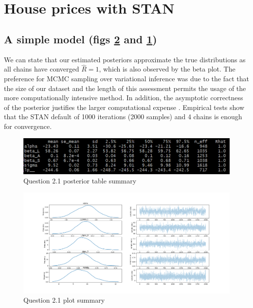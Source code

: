 \documentclass[11pt,a4paper,titlepage]{article}
\begin{document}
\section{House prices with STAN}
  \subsection{A simple model (figs \ref{fig:2.1} and \ref{tab:2.1})}
  We can state that our estimated posteriors approximate the true distributions as all chains have converged \(\hat{R} = 1\), which is also observed by the beta plot. The preference for MCMC sampling over variational inference was due to the fact that the size of our dataset and the length of this assessment permits the usage of the more computationally intensive method. In addition, the asymptotic correctness of the posterior justifies the larger computational expense \parencite{BleiVI}. Empirical tests show that the STAN default of 1000 iterations (2000 samples) and 4 chains is enough for convergence.

  \begin{figure}[htb]
    \centering
      \includegraphics[width=\textwidth]{../q21/q21_summary_table.png}
      \caption{Question 2.1 posterior table summary}
    \label{tab:2.1}
  \end{figure}

  \begin{figure}[htb]
    \centering
      \includegraphics[width=\textwidth]{../q21/separated_features.png}
      \caption{Question 2.1 plot summary}
    \label{fig:2.1}
  \end{figure}
\end{document}
